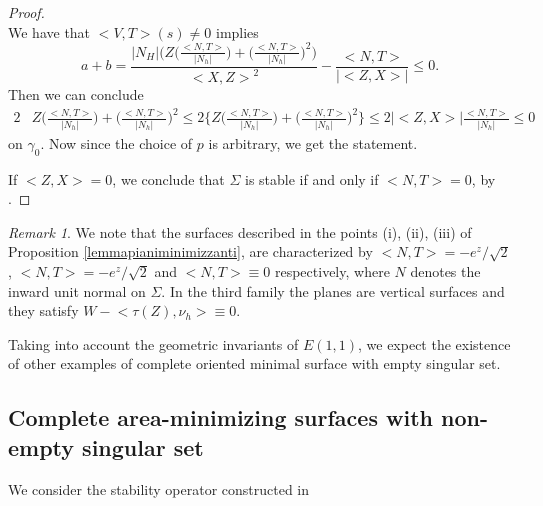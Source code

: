 \documentclass[10pt]{amsart}
\theoremstyle{definition}
\theoremstyle{remark}
\newtheorem{remark}[theorem]{Remark}
\numberwithin{equation}{section}
\begin{document}
\begin{proof}
\[\]
We have that ${\big<{V,T}\big>}(s)\neq 0$ implies 
\[
a+b=\frac{{|N_{H}|} \bigg( Z\bigg({\frac{{\big<{N,T}\big>}}{|N_h|}} \bigg)+{\bigg({\frac{{\big<{N,T}\big>}}{|N_h|}}\bigg)^2}   \bigg)}{{\big<{X,Z}\big>}^2} -\frac{{\big<{N,T}\big>}}{|{\big<{Z,X}\big>}|}{\leqslant} 0.
\] 
Then we can conclude 
\begin{equation*}
\begin{split}
2&Z\bigg({\frac{{\big<{N,T}\big>}}{|N_h|}} \bigg)+{\bigg({\frac{{\big<{N,T}\big>}}{|N_h|}}\bigg)^2}{\leqslant}2 \{Z\bigg({\frac{{\big<{N,T}\big>}}{|N_h|}} \bigg)+{\bigg({\frac{{\big<{N,T}\big>}}{|N_h|}}\bigg)^2}\}{\leqslant} 2 |{\big<{Z,X}\big>}|{\frac{{\big<{N,T}\big>}}{|N_h|}}{\leqslant} 0
\end{split}
\end{equation*}
on ${\gamma}_0$. Now since the choice of $p$ is arbitrary, we get the statement. 

If ${\big<{Z,X}\big>}=0$, we conclude that ${\Sigma}$ is stable if and only if ${{\big<{N,T}\big>}}=0$, by \cite[Proposition~9.8]{MR3044134}.

\end{proof}

\begin{remark} We note that the surfaces described in the points (i), (ii), (iii) of Proposition \ref{lemmapianiminimizzanti}, are characterized by ${{\big<{N,T}\big>}}=-e^z/\sqrt{2}$, ${{\big<{N,T}\big>}}=-e^z/\sqrt{2}$ and ${{\big<{N,T}\big>}}\equiv 0$ respectively, where $N$ denotes the inward unit normal on ${\Sigma}$. In the third family the planes are vertical surfaces and they satisfy $W-{\big<{\tau(Z),\nu_h}\big>}\equiv 0$. 
\end{remark}

Taking into account the geometric invariants of ${E(1,1)}$, we expect the existence of other examples of complete oriented minimal surface with empty singular set.

\subsection{Complete area-minimizing surfaces with non-empty singular set} 

We consider the stability operator constructed in \cite[Theorem~8.6]{MR3044134}
\end{document}
